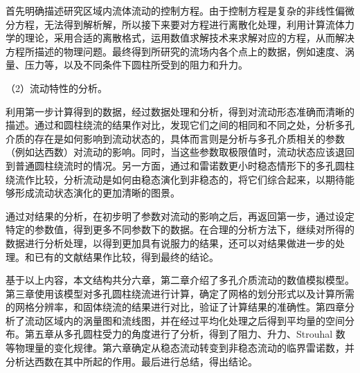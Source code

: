 首先明确描述研究区域内流体流动的控制方程。由于控制方程是复杂的非线性偏微分方程，无法得到解析解，所以接下来要对方程进行离散化处理，利用计算流体力学的理论，采用合适的离散格式，运用数值求解技术来求解对应的方程，从而解决方程所描述的物理问题。最终得到所研究的流场内各个点上的数据，例如速度、涡量、压力等，以及不同条件下圆柱所受到的阻力和升力。

（2）流动特性的分析。

利用第一步计算得到的数据，经过数据处理和分析，得到对流动形态准确而清晰的描述。通过和圆柱绕流的结果作对比，发现它们之间的相同和不同之处，分析多孔介质的存在是如何影响到流动状态的，具体而言则是分析与多孔介质相关的参数（例如达西数）对流动的影响。同时，当这些参数取极限值时，流动状态应该退回到普通圆柱绕流时的情况。另一方面，通过和雷诺数更小时稳态情形下的多孔圆柱绕流作比较，分析流动是如何由稳态演化到非稳态的，将它们综合起来，以期待能够形成流动状态演化的更加清晰的图景。

通过对结果的分析，在初步明了参数对流动的影响之后，再返回第一步，通过设定特定的参数值，得到更多不同参数下的数据。在合理的分析方法下，继续对所得的数据进行分析处理，以得到更加具有说服力的结果，还可以对结果做进一步的处理。和已有的文献结果作比较，得到最终的结论。

基于以上内容，本文结构共分六章，第二章介绍了多孔介质流动的数值模拟模型。第三章使用该模型对多孔圆柱绕流进行计算，确定了网格的划分形式以及计算所需的网格分辨率，和固体绕流的结果进行对比，验证了计算结果的准确性。第四章分析了流动区域内的涡量图和流线图，并在经过平均化处理之后得到平均量的空间分布。第五章从多孔圆柱受力的角度进行了分析，得到了阻力、升力、Strouhal 数等物理量的变化规律。第六章确定从稳态流动转变到非稳态流动的临界雷诺数，并分析达西数在其中所起的作用。最后进行总结，得出结论。
